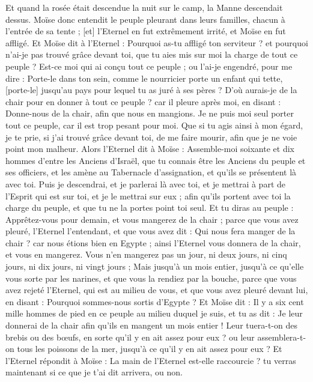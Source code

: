 \begin{multicols}{2}
Et quand la rosée était descendue la nuit sur le camp, la Manne descendait dessus.
Moïse donc entendit le peuple pleurant dans leurs familles, chacun à l'entrée de sa tente ; [et] l'Eternel en fut extrêmement irrité, et Moïse en fut affligé.
Et Moïse dit à l'Eternel : Pourquoi as-tu affligé ton serviteur ? et pourquoi n'ai-je pas trouvé grâce devant toi, que tu aies mis sur moi la charge de tout ce peuple ?
Est-ce moi qui ai conçu tout ce peuple ; ou l'ai-je engendré, pour me dire : Porte-le dans ton sein, comme le nourricier porte un enfant qui tette, [porte-le] jusqu'au pays pour lequel tu as juré à ses pères ?
D'où aurais-je de la chair pour en donner à tout ce peuple ? car il pleure après moi, en disant : Donne-nous de la chair, afin que nous en mangions.
Je ne puis moi seul porter tout ce peuple, car il est trop pesant pour moi.
Que si tu agis ainsi à mon égard, je te prie, si j'ai trouvé grâce devant toi, de me faire mourir, afin que je ne voie point mon malheur.
Alors l'Eternel dit à Moïse : Assemble-moi soixante et dix hommes d'entre les Anciens d'Israël, que tu connais être les Anciens du peuple et ses officiers, et les amène au Tabernacle d'assignation, et qu'ils se présentent là avec toi.
Puis je descendrai, et je parlerai là avec toi, et je mettrai à part de l'Esprit qui est sur toi, et je le mettrai sur eux ; afin qu'ils portent avec toi la charge du peuple, et que tu ne la portes point toi seul.
Et tu diras au peuple : Apprêtez-vous pour demain, et vous mangerez de la chair ; parce que vous avez pleuré, l'Eternel l'entendant, et que vous avez dit : Qui nous fera manger de la chair ? car nous étions bien en Egypte ; ainsi l'Eternel vous donnera de la chair, et vous en mangerez.
Vous n'en mangerez pas un jour, ni deux jours, ni cinq jours, ni dix jours, ni vingt jours ;
Mais jusqu'à un mois entier, jusqu'à ce qu'elle vous sorte par les narines, et que vous la rendiez par la bouche, parce que vous avez rejeté l'Eternel, qui est au milieu de vous, et que vous avez pleuré devant lui, en disant : Pourquoi sommes-nous sortis d'Egypte ?
Et Moïse dit : Il y a six cent mille hommes de pied en ce peuple au milieu duquel je suis, et tu as dit : Je leur donnerai de la chair afin qu'ils en mangent un mois entier !
Leur tuera-t-on des brebis ou des bœufs, en sorte qu'il y en ait assez pour eux ? ou leur assemblera-t-on tous les poissons de la mer, jusqu'à ce qu'il y en ait assez pour eux ?
Et l'Eternel répondit à Moïse : La main de l'Eternel est-elle raccourcie ? tu verras maintenant si ce que je t'ai dit arrivera, ou non.

\end{multicols}

